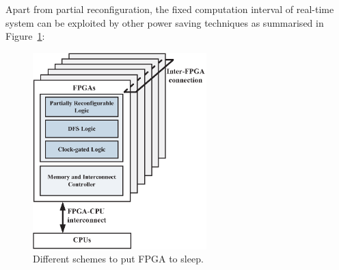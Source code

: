 Apart from partial reconfiguration, the fixed computation interval of real-time system can be exploited by other power saving techniques as summarised in Figure~\ref{fig:partial_scheme}:

\begin{figure}[t!]
\centering
\includegraphics[width=0.6\textwidth]{6_conclusion/figures/partial_scheme}
\caption{Different schemes to put FPGA to sleep.}
\label{fig:partial_scheme}
\end{figure}

